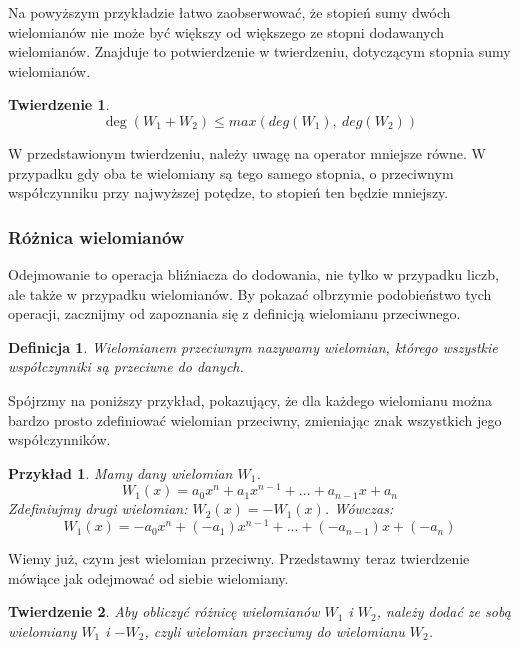 \documentclass[twoside,a4paper]{book}
\newtheorem{theorem}{Twierdzenie}
\newtheorem{definition}{Definicja}
\newtheorem{example}{Przykład}
\begin{document}
Na powyższym przykładzie łatwo zaobserwować, że stopień sumy dwóch wielomianów nie może być większy od większego ze stopni dodawanych wielomianów. Znajduje to potwierdzenie w twierdzeniu, dotyczącym stopnia sumy wielomianów.

\begin{theorem}
	\begin{equation}
		\deg(W_1 + W_2) \le max(deg(W_1),\ deg (W_2))
	\end{equation}
\end{theorem}

W przedstawionym twierdzeniu, należy uwagę na operator mniejsze równe. W przypadku gdy oba te wielomiany są tego samego stopnia, o przeciwnym współczynniku przy najwyższej potędze, to stopień ten będzie mniejszy.

\subsubsection{Różnica wielomianów}

Odejmowanie to operacja bliźniacza do dodowania, nie tylko w przypadku liczb, ale także w przypadku wielomianów. By pokazać olbrzymie podobieństwo tych operacji, zacznijmy od zapoznania się z definicją wielomianu przeciwnego.

\begin{definition}
	Wielomianem przeciwnym nazywamy wielomian, którego wszystkie współczynniki są przeciwne do danych.
\end{definition}

Spójrzmy na poniższy przykład, pokazujący, że dla każdego wielomianu można bardzo prosto zdefiniować wielomian przeciwny, zmieniając znak wszystkich jego współczynników.

\begin{example}
	Mamy dany wielomian $W_1$.
	\begin{equation}
		W_1(x) = a_0x^n + a_1x^{n-1} + ... + a_{n-1}x + a_n
	\end{equation}
	Zdefiniujmy drugi wielomian: $W_2(x) = -W_1(x)$. Wówczas:
	\begin{equation}
		W_1(x) = -a_0x^n + (-a_1)x^{n-1} + ... + (-a_{n-1})x + (-a_n)
	\end{equation}
\end{example}

Wiemy już, czym jest wielomian przeciwny. Przedstawmy teraz twierdzenie mówiące jak odejmować od siebie wielomiany.

\begin{theorem}
	Aby obliczyć różnicę wielomianów $W_1$ i $W_2$, należy dodać ze sobą wielomiany $W_1$ i $-W_2$, czyli wielomian przeciwny do wielomianu $W_2$.
\end{theorem}
\end{document}
